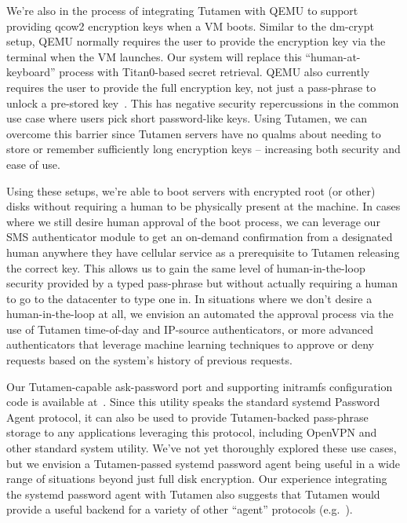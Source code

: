 We're also in the process of integrating Tutamen with QEMU to support
providing qcow2 encryption keys when a VM boots. Similar to the
dm-crypt setup, QEMU normally requires the user to provide the
encryption key via the terminal when the VM launches. Our system will
replace this ``human-at-keyboard'' process with Titan0-based secret
retrieval. QEMU also currently requires the user to provide the full
encryption key, not just a pass-phrase to unlock a pre-stored
key~\cite{berrange-qemucrypto}. This has negative security
repercussions in the common use case where users pick short
password-like keys. Using Tutamen, we can overcome this barrier since
Tutamen servers have no qualms about needing to store or remember
sufficiently long encryption keys -- increasing both security and ease
of use.


Using these setups, we're able to boot servers with encrypted root (or
other) disks without requiring a human to be physically present at the
machine. In cases where we still desire human approval of the boot
process, we can leverage our SMS authenticator module to get an
on-demand confirmation from a designated human anywhere they have
cellular service as a prerequisite to Tutamen releasing the correct
key. This allows us to gain the same level of human-in-the-loop
security provided by a typed pass-phrase but without actually
requiring a human to go to the datacenter to type one in. In
situations where we don't desire a human-in-the-loop at all, we
envision an automated the approval process via the use of Tutamen
time-of-day and IP-source authenticators, or more advanced
authenticators that leverage machine learning techniques to approve or
deny requests based on the system's history of previous requests.

Our Tutamen-capable ask-password port and supporting initramfs
configuration code is available
at~\cite{src-tutamen-askpassword}. Since this utility speaks the
standard systemd Password Agent protocol, it can also be used to
provide Tutamen-backed pass-phrase storage to any applications
leveraging this protocol, including OpenVPN and other standard system
utility. We've not yet thoroughly explored these use cases, but we
envision a Tutamen-passed systemd password agent being useful in a
wide range of situations beyond just full disk encryption. Our
experience integrating the systemd password agent with Tutamen also
suggests that Tutamen would provide a useful backend for a variety of
other ``agent'' protocols (e.g.~\cite{cox2002, ylonen1996}).

